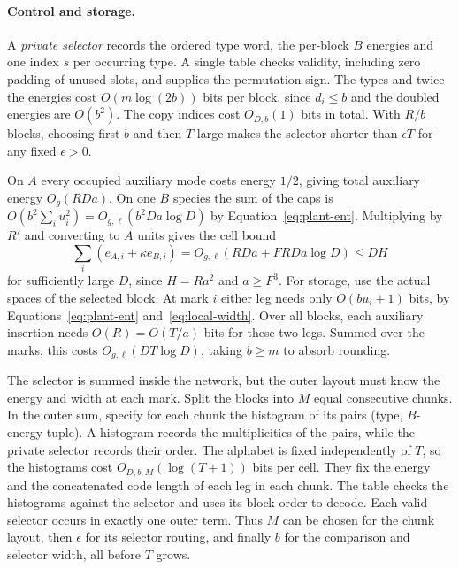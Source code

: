 \paragraph{Control and storage.}
A \emph{private selector} records the ordered type word, the
per-block $B$ energies and one index $s$ per occurring type. A single
table checks validity, including zero padding of unused slots, and
supplies the permutation sign. The types and twice the energies cost
$O(m\log(2b))$ bits per block, since $d_i\le b$ and the doubled
energies are $O(b^2)$. The copy indices cost $O_{D,b}(1)$ bits in
total. With $R/b$ blocks, choosing first $b$ and then $T$ large makes
the selector shorter than $\epsilon T$ for any fixed $\epsilon>0$.

On $A$ every occupied auxiliary mode costs energy $1/2$, giving
total auxiliary energy $O_g(RDa)$. On one $B$ species the sum of
the caps is $O(b^2\sum_i u_i^2)=O_{g,\ell}(b^2 Da\log D)$ by
Equation~\eqref{eq:plant-ent}. Multiplying by $R'$ and converting to
$A$ units gives the cell bound
\[
 \sum_i(e_{A,i}+\kappa e_{B,i})
    =O_{g,\ell}(RDa+F RDa\log D)\le D H
\]
for sufficiently large $D$, since $H=Ra^2$ and $a\ge F^3$.
For storage, use the actual spaces of the selected block. At mark $i$
either leg needs only $O(bu_i+1)$ bits, by
Equations~\eqref{eq:plant-ent} and~\eqref{eq:local-width}.
Over all blocks, each auxiliary insertion needs $O(R)=O(T/a)$ bits
for these two legs. Summed over the marks, this costs
$O_{g,\ell}(DT\log D)$, taking $b\ge m$ to absorb rounding.

The selector is summed inside the network, but the outer layout must
know the energy and width at each mark. Split the blocks into $M$ equal
consecutive chunks. In the outer sum, specify for each chunk the
histogram of its pairs (type, $B$-energy tuple). A histogram records
the multiplicities of the pairs, while the private selector records
their order. The alphabet is fixed independently of $T$, so the
histograms cost $O_{D,b,M}(\log(T+1))$ bits per cell. They fix the
energy and the concatenated code length of each leg in each chunk.
The table checks the histograms against the selector and uses its block
order to decode. Each valid selector occurs in exactly one outer term.
Thus $M$ can be chosen for the chunk layout, then $\epsilon$ for its
selector routing, and finally $b$ for the comparison and selector width,
all before $T$ grows.
